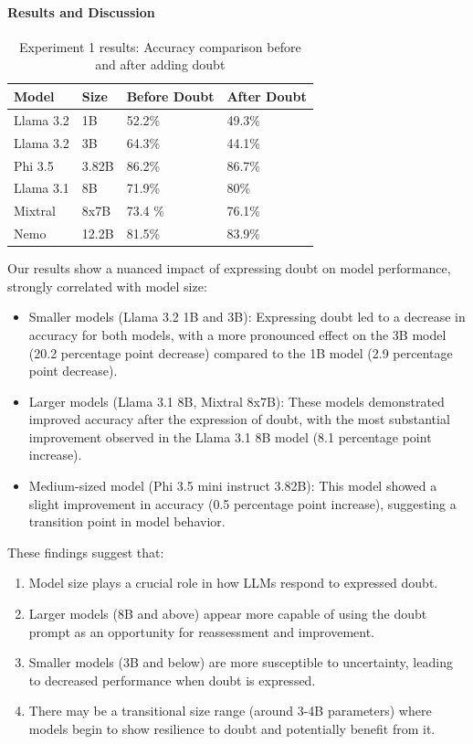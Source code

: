 \paragraph{Results and Discussion}
\begin{table}[ht]
  \centering
  \small
  \begin{tabular}{|l|l|l|l|}
    \hline
    \textbf{Model} & \textbf{Size} & \textbf{Before Doubt} & \textbf{After Doubt} \\
    \hline
    Llama 3.2 & 1B  & 52.2\% & 49.3\% \\
    Llama 3.2 & 3B & 64.3\% & 44.1\% \\
    Phi 3.5 & 3.82B & 86.2\% & 86.7\%\\
    Llama 3.1 & 8B & 71.9\% & 80\% \\
    Mixtral & 8x7B & 73.4 \% & 76.1\% \\
    Nemo & 12.2B & 81.5\% & 83.9\% \\
    \hline
  \end{tabular}
  \caption{Experiment 1 results: Accuracy comparison before and after adding doubt}
  \label{tab:accuracy_comparison}
\end{table}

Our results show a nuanced impact of expressing doubt on model performance, strongly correlated with model size:

\begin{itemize}
  \item Smaller models (Llama 3.2 1B and 3B): Expressing doubt led to a decrease in accuracy for both models, with a more pronounced effect on the 3B model (20.2 percentage point decrease) compared to the 1B model (2.9 percentage point decrease).

  \item Larger models (Llama 3.1 8B, Mixtral 8x7B): These models demonstrated improved accuracy after the expression of doubt, with the most substantial improvement observed in the Llama 3.1 8B model (8.1 percentage point increase).

  \item Medium-sized model (Phi 3.5 mini instruct 3.82B): This model showed a slight improvement in accuracy (0.5 percentage point increase), suggesting a transition point in model behavior.
\end{itemize}

These findings suggest that:

\begin{enumerate}
  \item Model size plays a crucial role in how LLMs respond to expressed doubt.
  \item Larger models (8B and above) appear more capable of using the doubt prompt as an opportunity for reassessment and improvement.
  \item Smaller models (3B and below) are more susceptible to uncertainty, leading to decreased performance when doubt is expressed.
  \item There may be a transitional size range (around 3-4B parameters) where models begin to show resilience to doubt and potentially benefit from it.
\end{enumerate}

